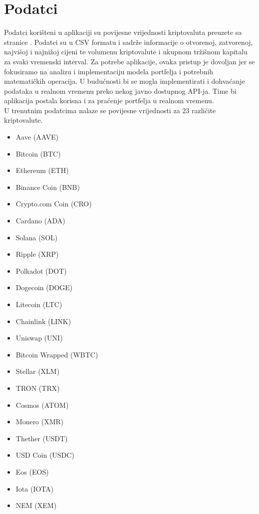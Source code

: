 \documentclass[zavrsnirad, upload]{fer}
\begin{document}
\section{Podatci}
\label{sek:podaci}
Podatci korišteni u aplikaciji su povijesne vrijednosti
kriptovaluta preuzete sa stranice \cite{kaggledataset}.
Podatci su u CSV formatu i sadrže informacije o otvorenoj, zatvorenoj,
najvišoj i najnižoj cijeni te volumenu kriptovalute i ukupnom tržišnom
kapitalu za svaki vremenski interval. Za potrebe aplikacije,
ovaka pristup je dovoljan jer se fokusiramo na analizu i
implementaciju modela portfelja i potrebnih matematičkih operacija.
U budućnosti bi se mogla implementirati i dohvaćanje podataka
u realnom vremenu preko nekog javno dostupnog API-ja. Time bi
aplikacija postala korisna i za praćenje portfelja u realnom vremenu.\\
U trenutnim podatcima nalaze se povijesne vrijednosti za 23 različite kriptovalute.
\begin{itemize}
    \item Aave (AAVE)
    \item Bitcoin (BTC)
    \item Ethereum (ETH)
    \item Binance Coin (BNB)
    \item Crypto.com Coin (CRO)
    \item Cardano (ADA)
    \item Solana (SOL)
    \item Ripple (XRP)
    \item Polkadot (DOT)
    \item Dogecoin (DOGE)
    \item Litecoin (LTC)
    \item Chainlink (LINK)
    \item Uniswap (UNI)
    \item Bitcoin Wrapped (WBTC)
    \item Stellar (XLM)
    \item TRON (TRX)
    \item Cosmos (ATOM)
    \item Monero (XMR)
    \item Thether (USDT)
    \item USD Coin (USDC)
    \item Eos (EOS)
    \item Iota (IOTA)
    \item NEM (XEM)
\end{itemize}


\end{document}
